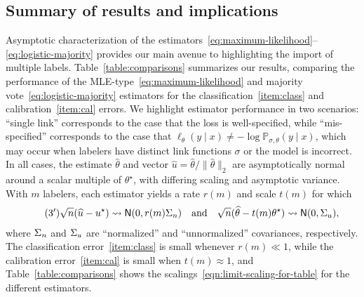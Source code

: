 \documentclass[11pt]{article}
\newcommand{\Prb}{\mathbb{P}}
\newcommand{\what}[1]{\widehat{#1}}
\newcommand{\normal}{\mathsf{N}}
\newcommand{\loss}{\ell}
\newcommand{\norms}[1]{\|{#1}\|} %
\newcommand{\ltwos}[1]{\norms{#1}_2} %
\newcommand{\<}{\langle} %
\renewcommand{\>}{\rangle}
\newcommand{\cd}{\rightsquigarrow}
\newcommand{\opt}{^\star}
\begin{document}
\subsection{Summary of results and implications}

Asymptotic characterization of the
estimators~\eqref{eq:maximum-likelihood}--\eqref{eq:logistic-majority}
provides our main avenue to highlighting the import of multiple labels.
%
Table~\ref{table:comparisons}  summarizes our results, comparing
the performance of the MLE-type~\eqref{eq:maximum-likelihood} and
majority vote~\eqref{eq:logistic-majority} estimators for the
classification~\ref{item:class} and calibration~\ref{item:cal} errors.
%
We highlight estimator performance in two scenarios:
``single link'' corresponds to the case that the loss is
well-specified, while ``mis-specified''
corresponds to the case that $\loss_\theta(y \mid x) \neq -\log
\Prb_{\sigma,\theta}(y \mid x)$, which may occur when labelers have
distinct link functions $\sigma$ or the model is incorrect.
%
In all cases, the
estimate $\what{\theta}$ and
vector $\what{u} = \what{\theta} / \ltwos{\what{\theta}}$
are asymptotically normal around a scalar multiple of $\theta\opt$,
with differing scaling and asymptotic variance.
%
With $m$ labelers,
each estimator yields a rate $r(m)$ and scale $t(m)$ for which
\begin{align}
\tag{\ensuremath{3'}}
  \label{eqn:limit-scaling-for-table}
  \sqrt{n}(\what{u} - u\opt)
  \cd \normal(0, r(m) \Sigma_{\textup{n}})
  ~~~ \mbox{and} ~~~
  \sqrt{n}(\what{\theta} - t(m) \theta\opt)
  \cd \normal(0, \Sigma_{\textup{u}}),
\end{align}
where $\Sigma_{\textup{n}}$ and $\Sigma_{\textup{u}}$ are ``normalized'' and
``unnormalized'' covariances, respectively.
%
The classification error~\ref{item:class} is small whenever $r(m) \ll 1$,
while the calibration error~\ref{item:cal} is small when $t(m) \approx 1$,
and Table~\ref{table:comparisons} shows the
scalings~\eqref{eqn:limit-scaling-for-table} for the different estimators.
\end{document}
